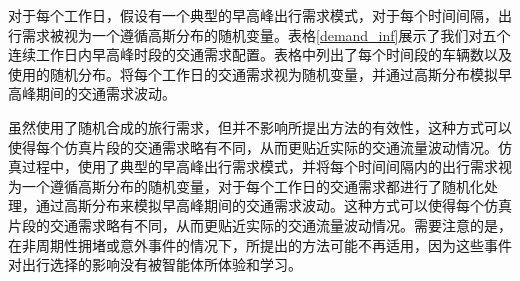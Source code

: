 对于每个工作日，假设有一个典型的早高峰出行需求模式，对于每个时间间隔，出行需求被视为一个遵循高斯分布的随机变量。表格\ref{demand_inf}展示了我们对五个连续工作日内早高峰时段的交通需求配置。表格中列出了每个时间段的车辆数以及使用的随机分布。将每个工作日的交通需求视为随机变量，并通过高斯分布模拟早高峰期间的交通需求波动。
\renewcommand{\arraystretch}{1.2} %
\begin{table}[htbp]
\centering
\caption{连续五个工作日早高峰期的出行需求配置}
\label{demand_inf}
\begin{adjustbox}{center}
\end{adjustbox}
\end{table}


虽然使用了随机合成的旅行需求，但并不影响所提出方法的有效性，这种方式可以使得每个仿真片段的交通需求略有不同，从而更贴近实际的交通流量波动情况。仿真过程中，使用了典型的早高峰出行需求模式，并将每个时间间隔内的出行需求视为一个遵循高斯分布的随机变量，对于每个工作日的交通需求都进行了随机化处理，通过高斯分布来模拟早高峰期间的交通需求波动。这种方式可以使得每个仿真片段的交通需求略有不同，从而更贴近实际的交通流量波动情况。需要注意的是，在非周期性拥堵或意外事件的情况下，所提出的方法可能不再适用，因为这些事件对出行选择的影响没有被智能体所体验和学习。

